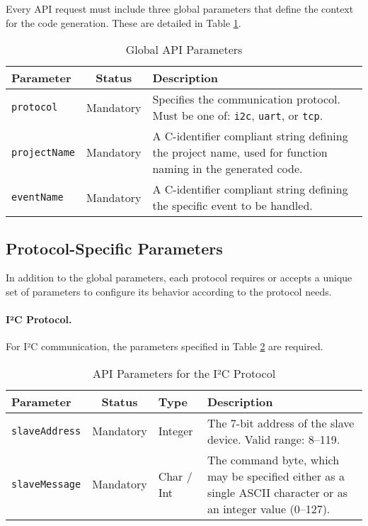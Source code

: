 Every API request must include three global parameters that define the context for the code generation. These are detailed in Table \ref{tab:global_params}.

\begin{table}[h!]
    \centering
    \caption{Global API Parameters}
    \label{tab:global_params}
    \begin{tabular}{|l|c|p{9cm}|}
        \hline
        \textbf{Parameter} & \textbf{Status} & \textbf{Description} \\ \hline
        \texttt{protocol} & Mandatory & Specifies the communication protocol. Must be one of: \texttt{i2c}, \texttt{uart}, or \texttt{tcp}. \\ \hline
        \texttt{projectName} & Mandatory & A C-identifier compliant string defining the project name, used for function naming in the generated code. \\ \hline
        \texttt{eventName} & Mandatory & A C-identifier compliant string defining the specific event to be handled. \\ \hline
    \end{tabular}
\end{table}

\subsection{Protocol-Specific Parameters}
\label{subsec:protocol_params}

In addition to the global parameters, each protocol requires or accepts a unique set of parameters to configure its behavior according to the protocol needs.

\paragraph{I²C Protocol.} For I²C communication, the parameters specified in Table \ref{tab:i2c_params} are required.

\begin{table}[h!]
    \centering
    \caption{API Parameters for the I²C Protocol}
    \label{tab:i2c_params}
    \begin{tabular}{|l|c|l|p{6cm}|}
        \hline
        \textbf{Parameter} & \textbf{Status} & \textbf{Type} & \textbf{Description} \\ \hline
        \texttt{slaveAddress} & Mandatory & Integer & The 7-bit address of the slave device. Valid range: 8–119. \\ \hline
        \texttt{slaveMessage} & Mandatory & Char / Int & The command byte, which may be specified either as a single ASCII character or as an integer value (0–127). \\ \hline
    \end{tabular}
\end{table}

